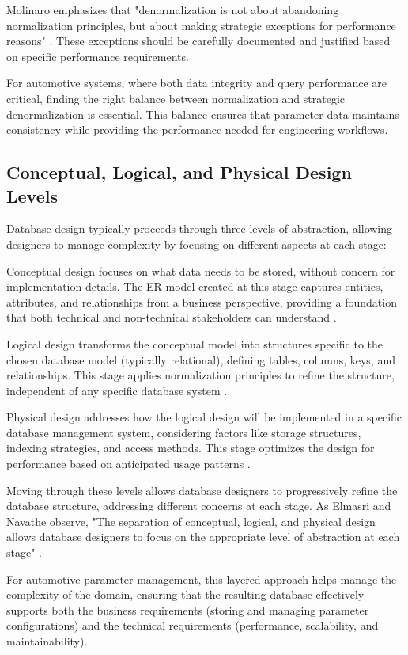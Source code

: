 Molinaro emphasizes that "denormalization is not about abandoning normalization principles, but about making strategic exceptions for performance reasons" \cite{molinaro2005sql}. These exceptions should be carefully documented and justified based on specific performance requirements.

For automotive systems, where both data integrity and query performance are critical, finding the right balance between normalization and strategic denormalization is essential. This balance ensures that parameter data maintains consistency while providing the performance needed for engineering workflows.

\subsection{Conceptual, Logical, and Physical Design Levels}
\label{subsec:design-levels}

Database design typically proceeds through three levels of abstraction, allowing designers to manage complexity by focusing on different aspects at each stage:

Conceptual design focuses on what data needs to be stored, without concern for implementation details. The ER model created at this stage captures entities, attributes, and relationships from a business perspective, providing a foundation that both technical and non-technical stakeholders can understand \cite{elmasri2015fundamentals}.

Logical design transforms the conceptual model into structures specific to the chosen database model (typically relational), defining tables, columns, keys, and relationships. This stage applies normalization principles to refine the structure, independent of any specific database system \cite{elmasri2015fundamentals}.

Physical design addresses how the logical design will be implemented in a specific database management system, considering factors like storage structures, indexing strategies, and access methods. This stage optimizes the design for performance based on anticipated usage patterns \cite{obe2017postgresql}.

Moving through these levels allows database designers to progressively refine the database structure, addressing different concerns at each stage. As Elmasri and Navathe observe, "The separation of conceptual, logical, and physical design allows database designers to focus on the appropriate level of abstraction at each stage" \cite{elmasri2015fundamentals}.

For automotive parameter management, this layered approach helps manage the complexity of the domain, ensuring that the resulting database effectively supports both the business requirements (storing and managing parameter configurations) and the technical requirements (performance, scalability, and maintainability).